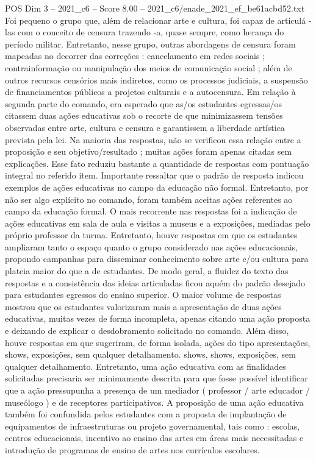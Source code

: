 \begin{textsample}{POS Dim 3 – 2021\_c6 – Score 8.00 – 2021\_c6/enade\_2021\_ef\_be61acbd52.txt}
Foi pequeno o grupo que, além de relacionar arte e cultura, foi capaz de articulá -las com o conceito de censura trazendo -a, quase sempre, como herança do período militar.
Entretanto, nesse grupo, outras abordagens de censura foram mapeadas no decorrer das correções : cancelamento em redes sociais ; contrainformação ou manipulação dos meios de comunicação social ; além de outros recursos censórios mais indiretos, como os processos judiciais, a suspensão de financiamentos públicos a projetos culturais e a autocensura.
Em relação à segunda parte do comando, era esperado que as/os estudantes egressas/os citassem duas ações educativas sob o recorte de que minimizassem tensões observadas entre arte, cultura e censura e garantissem a liberdade artística prevista pela lei.
Na maioria das respostas, não se verificou essa relação entre a proposição e seu objetivo/resultado ; muitas ações foram apenas citadas sem explicações.
Esse fato reduziu bastante a quantidade de respostas com pontuação integral no referido item.
Importante ressaltar que o padrão de resposta indicou exemplos de ações educativas no campo da educação não formal.
Entretanto, por não ser algo explícito no comando, foram também aceitas ações referentes ao campo da educação formal.
O mais recorrente nas respostas foi a indicação de ações educativas em sala de aula e visitas a museus e a exposições, mediadas pelo próprio professor da turma.
Entretanto, houve respostas em que os estudantes ampliaram tanto o espaço quanto o grupo considerado nas ações educacionais, propondo campanhas para disseminar conhecimento sobre arte e/ou cultura para plateia maior do que a de estudantes.
De modo geral, a fluidez do texto das respostas e a consistência das ideias articuladas ficou aquém do padrão desejado para estudantes egressos do ensino superior.
O maior volume de respostas mostrou que os estudantes valorizaram mais a apresentação de duas ações educativas, muitas vezes de forma incompleta, apenas citando uma ação proposta e deixando de explicar o desdobramento solicitado no comando.
Além disso, houve respostas em que sugeriram, de forma isolada, ações do tipo apresentações, shows, exposições, sem qualquer detalhamento. shows, shows, exposições, sem qualquer detalhamento.
Entretanto, uma ação educativa com as finalidades solicitadas precisaria ser minimamente descrita para que fosse possível identificar que a ação pressupunha a presença de um mediador ( professor / arte educador / museólogo ) e de receptores participativos.
A proposição de uma ação educativa também foi confundida pelos estudantes com a proposta de implantação de equipamentos de infraestruturas ou projeto governamental, tais como : escolas, centros educacionais, incentivo ao ensino das artes em áreas mais necessitadas e introdução de programas de ensino de artes nos currículos escolares.

\end{textsample}
